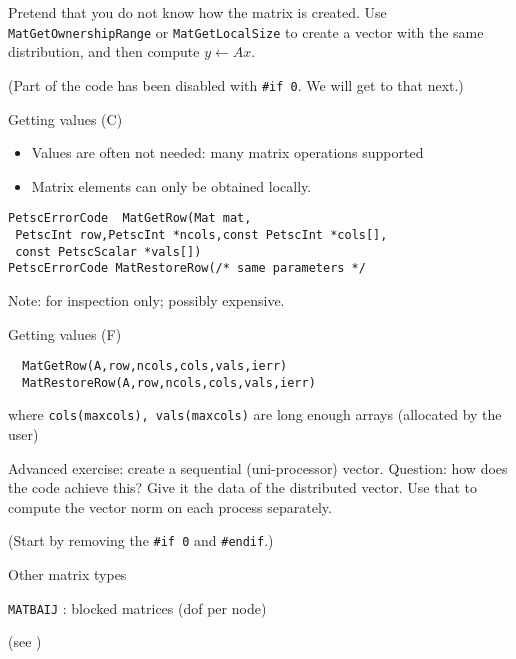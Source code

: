 \begin{exerciseframe}[matvec]
  Pretend that you do not know how the matrix is created. Use
  \lstinline{MatGetOwnershipRange} or \lstinline{MatGetLocalSize} to create a vector
  with the same distribution, and then compute $y\leftarrow Ax$.

  (Part of the code has been disabled with \verb+#if 0+. We will get
  to that next.)
\end{exerciseframe}

\begin{details}
\begin{numberedframe}{Getting values (C)}
  \begin{itemize}
  \item Values are often not needed: many matrix operations supported
  \item Matrix elements can only be obtained locally.
  \end{itemize}
\begin{lstlisting}
PetscErrorCode  MatGetRow(Mat mat,
 PetscInt row,PetscInt *ncols,const PetscInt *cols[],
 const PetscScalar *vals[])
PetscErrorCode MatRestoreRow(/* same parameters */
\end{lstlisting}
Note: for inspection only; possibly expensive.
\end{numberedframe}

\begin{numberedframe}{Getting values (F)}
\begin{lstlisting}
  MatGetRow(A,row,ncols,cols,vals,ierr)
  MatRestoreRow(A,row,ncols,cols,vals,ierr)
\end{lstlisting}
where \lstinline{cols(maxcols), vals(maxcols)} are long enough arrays
(allocated by the user)
\end{numberedframe}

\begin{exerciseframe}[matvec]
  Advanced exercise: create a sequential (uni-processor)
  vector. Question: how does the code achieve this?
  Give it the data of the distributed vector. Use that to compute the
  vector norm on each process separately.

  (Start by removing the \verb+#if 0+ and \verb+#endif+.)
\end{exerciseframe}

\begin{numberedframe}{Other matrix types}

\lstinline{MATBAIJ} : blocked matrices (dof per node)

(see )


\end{numberedframe}
\end{details}
